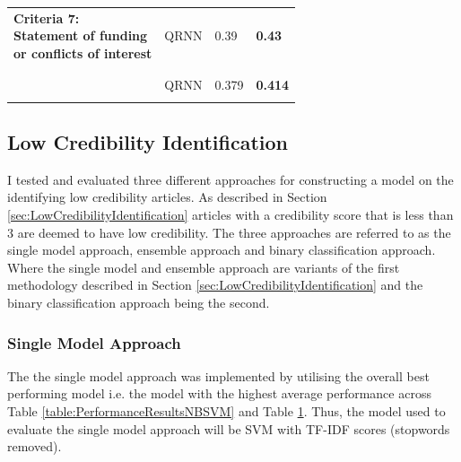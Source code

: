 \documentclass[a4paper,twoside,phd]{BYUPhys}
\begin{document}
\begin{table}[H]
\begin{tabular}{|p{6cm}|p{2cm}|p{3cm}|p{3.3cm}|}
			
			\multirowcell{3}{\textbf{Criteria 7:} \\ \textbf{Statement of funding} \\ \textbf{or conflicts of interest}} 
			& QRNN & 0.39 & \textbf{0.43} \\ 
			& & &\\ & & &\\ 
			\hline 
			
			
			\multirowcell{2}{\textbf{Average} \textbf{Performance}} 
			& QRNN & 0.379 & \textbf{0.414}      \\ 
			& & &      \\
			\hline                                                                                                                                          
	\end{tabular}
	\label{table:PerformanceResultsQRNN}
\end{table}


\subsection{Low Credibility Identification}
\label{sec:LowCredibilityIdentificationResults}

I tested and evaluated three different approaches for constructing a model on the identifying low credibility articles. As described in Section \ref{sec:LowCredibilityIdentification} articles with a credibility score that is less than 3 are deemed to have low credibility. The three approaches are referred to as the single model approach, ensemble approach and binary classification approach. Where the single model and ensemble approach are variants of the first methodology described in Section \ref{sec:LowCredibilityIdentification} and the binary classification approach being the second.\newline

\subsubsection{Single Model Approach}
The the single model approach was implemented by utilising the overall best performing model i.e. the model with the highest average performance across Table \ref{table:PerformanceResultsNBSVM} and Table \ref{table:PerformanceResultsQRNN}. Thus, the model used to evaluate the single model approach will be SVM with TF-IDF scores (stopwords removed). \newline
\end{document}
